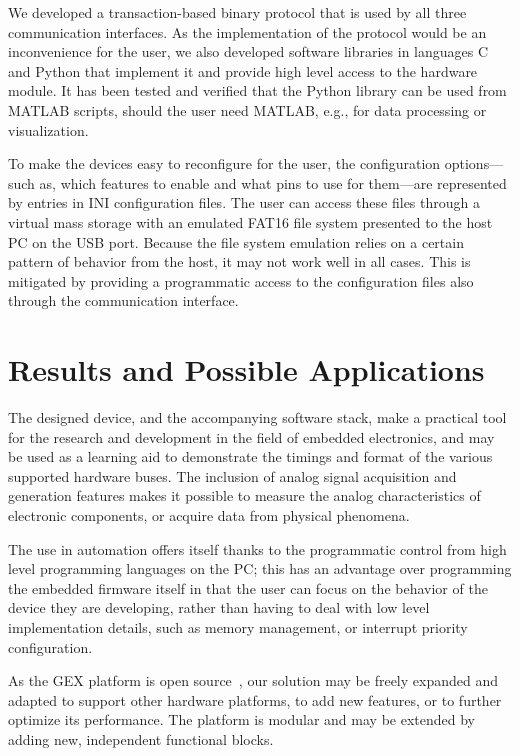 We developed a transaction-based binary protocol that is used by all three communication interfaces. As the implementation of the protocol would be an inconvenience for the user, we also developed software libraries in languages C and Python that implement it and provide high level access to the hardware module. It has been tested and verified that the Python library can be used from MATLAB scripts, should the user need MATLAB, e.g., for data processing or visualization.

To make the devices easy to reconfigure for the user, the configuration options--- such as, which features to enable and what pins to use for them---are represented by entries in INI configuration files. The user can access these files through a virtual mass storage with an emulated FAT16 file system presented to the host \gls{PC} on the \gls{USB} port. Because the file system emulation relies on a certain pattern of behavior from the host, it may not work well in all cases. This is mitigated by providing a programmatic access to the configuration files also through the communication interface. 

\section{Results and Possible Applications}

The designed device, and the accompanying software stack, make a practical tool for the research and development in the field of embedded electronics, and may be used as a learning aid to demonstrate the timings and format of the various supported hardware buses. The inclusion of analog signal acquisition and generation features makes it possible to measure the analog characteristics of electronic components, or acquire data from physical phenomena. 

The use in automation offers itself thanks to the programmatic control from high level programming languages on the \gls{PC}; this has an advantage over programming the embedded firmware itself in that the user can focus on the behavior of the device they are developing, rather than having to deal with low level implementation details, such as memory management, or interrupt priority configuration.

As the GEX platform is open source~\cite{gex-gh}, our solution may be freely expanded and adapted to support other hardware platforms, to add new features, or to further optimize its performance. The platform is modular and may be extended by adding new, independent functional blocks.

